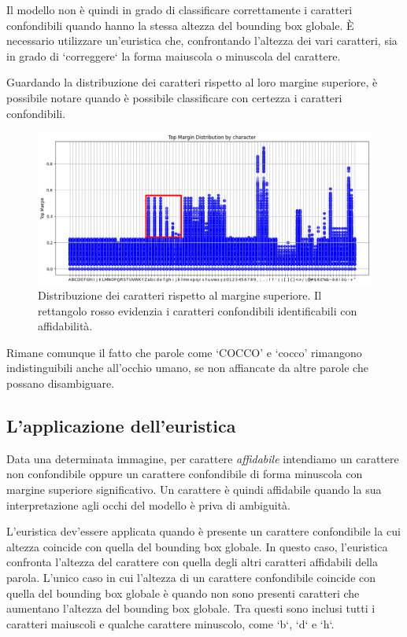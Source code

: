 Il modello non è quindi in grado di classificare correttamente i caratteri confondibili quando hanno la stessa altezza del bounding box globale.
È necessario utilizzare un'euristica che, confrontando l'altezza dei vari caratteri, sia in grado di `correggere` la forma maiuscola o minuscola del carattere.

Guardando la distribuzione dei caratteri rispetto al loro margine superiore, è possibile notare quando è possibile classificare con certezza i caratteri confondibili.

\begin{figure}[H]
	\centering
	\includegraphics[width=1\textwidth]{images/top_margin_distribution_highlight.png}
	\caption{Distribuzione dei caratteri rispetto al margine superiore. Il rettangolo rosso evidenzia i caratteri confondibili identificabili con affidabilità.}
	\label{fig:top_margin_distribution_highlight.png}
\end{figure}

Rimane comunque il fatto che parole come `COCCO' e `cocco' rimangono indistinguibili anche all'occhio umano, se non affiancate da altre parole che possano disambiguare.

\subsection{L'applicazione dell'euristica}

Data una determinata immagine, per carattere \emph{affidabile} intendiamo un carattere non confondibile oppure un carattere confondibile di forma minuscola con margine superiore significativo. Un carattere è quindi affidabile quando la sua interpretazione agli occhi del modello è priva di ambiguità.

L'euristica dev'essere applicata quando è presente un carattere confondibile la cui altezza coincide con quella del bounding box globale. In questo caso, l'euristica confronta l'altezza del carattere con quella degli altri caratteri affidabili della parola.
L'unico caso in cui l'altezza di un carattere confondibile coincide con quella del bounding box globale è quando non sono presenti caratteri che aumentano l'altezza del bounding box globale. Tra questi sono inclusi tutti i caratteri maiuscoli e qualche carattere minuscolo, come `b`, `d` e `h`.
